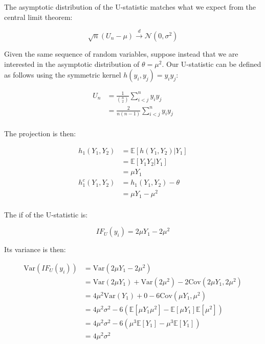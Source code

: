 \documentclass{report}
\begin{document}
The asymptotic distribution of the U-statistic matches what we expect from the central limit theorem:

\begin{equation}\label{eq:ex-lst-u-statistic-mean-asymptotics}
    \sqrt{n}(U_n - \mu) \overset{d}{\to} \mathcal{N}(0, \sigma^2)
\end{equation}

Given the same sequence of random variables, suppose instead that we are interested in the asymptotic distribution of $\theta = \mu^2$. Our U-statistic can be defined as follows using the symmetric kernel $h(y_i, y_j) = y_iy_j$:

\begin{equation}\label{eq:ex-lst-u-staistic-m2}
    \begin{aligned}
      U_n 
        &= \frac{1}{\binom{n}{2}} \sum_{i<j}^n y_iy_j \\
        &= \frac{2}{n(n-1)} \sum_{i<j}^n y_iy_j \\
    \end{aligned}
\end{equation}

The projection is then:

\begin{equation}\label{eq:ex-lst-u-statistic-m2-projection}
    \begin{aligned}
      h_1(Y_1, Y_2)
        &= \mathbb{E}[h(Y_1, Y_2) | Y_1] \\
        &= \mathbb{E}[Y_1Y_2 | Y_1] \\
        &= \mu Y_1 \\
      h_1^c(Y_1, Y_2)
        &= h_1(Y_1, Y_2) - \theta \\
        &= \mu Y_1 - \mu^2 \\
    \end{aligned}
\end{equation}

The \gls{if} of the U-statistic is:

\begin{equation}\label{eq:ex-lst-u-statistic-m2-if}
    IF_U(y_i) = 2\mu Y_1 - 2\mu^2 
\end{equation}

Its variance is then:

\begin{equation}\label{eq:ex-lst-u-statistic-m2-if-variance}
    \begin{aligned}
      \text{Var}(IF_U(y_i))
        &= \text{Var}(2\mu Y_1 - 2\mu^2) \\
        &= \text{Var}(2\mu Y_1) + \text{Var}(2\mu^2) - 2\text{Cov}(2\mu Y_1, 2\mu^2) \\
        &= 4\mu^2 \text{Var}(Y_1) + 0 - 6\text{Cov}(\mu Y_1, \mu^2) \\
        &= 4\mu^2\sigma^2 - 6(\mathbb{E}[\mu Y_1 \mu^2] - \mathbb{E}[\mu Y_1]\mathbb{E}[\mu^2]) \\
        &= 4\mu^2\sigma^2 - 6(\mu^3\mathbb{E}[Y_1] - \mu^3\mathbb{E}[Y_1]) \\
        &= 4\mu^2\sigma^2 \\
    \end{aligned}
\end{equation}
\end{document}
